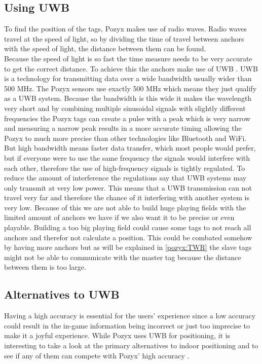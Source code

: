 \subsection{Using UWB}
To find the position of the tags, Pozyx makes use of radio waves. 
Radio waves travel at the speed of light, so by dividing the time of travel between anchors with the speed of light, the distance between them can be found.\\
Because the speed of light is so fast the time measure needs to be very accurate to get the correct distance.
To achieve this the anchors make use of UWB \cite{pozyx-UWB}.
UWB is a technology for transmitting data over a wide bandwidth usually wider than 500 MHz.
The Pozyx sensors use exactly 500 MHz which means they just qualify as a UWB system.
Because the bandwidth is this wide it makes the wavelength very short and by combining multiple sinusoidal signals with slightly different frequencies the Pozyx tags can create a pulse with a peak which is very narrow and measuring a narrow peak results in a more accurate timing allowing the Pozyx to much more precise than other technologies like Bluetooth and WiFi.
But high bandwidth means faster data transfer, which most people would prefer, but if everyone were to use the same frequency the signals would interfere with each other, therefore the use of high-frequency signals is tightly regulated\cite{tait-radio}.
To reduce the amount of interference the regulations say that UWB systems may only transmit at very low power.
This means that a UWB transmission can not travel very far and therefore the chance of it interfering with another system is very low.
Because of this we are not able to build huge playing fields with the limited amount of anchors we have if we also want it to be precise or even playable.
Building a too big playing field could cause some tags to not reach all anchors and therefor not calculate a position.
This could be combated somehow by having more anchors but as will be explained in \ref{pozyx:TWR} the slave tags might not be able to communicate with the master tag because the distance between them is too large.

\subsection{Alternatives to UWB}
Having a high accuracy is essential for the users' experience since a low accuracy could result in the in-game information being incorrect or just too imprecise to make it a joyful experience.
While Pozyx uses UWB for positioning, it is interesting to take a look at the primary alternatives to indoor positioning and to see if any of them can compete with Pozyx' high accuracy \cite{pozyx}.

